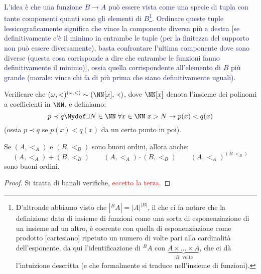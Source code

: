 \documentclass[11pt]{scrartcl}
\begin{document}
\textcolor{MidnightBlue}{L'idea è che una funzione $B \rightarrow A$ può essere vista come una specie di tupla con tante componenti quanti sono gli elementi di $B$\footnote{D'altronde abbiamo visto che $|{}^{B}A| = |A|^{|B|}$, il che ci fa notare che la definizione data di insieme di funzioni come una sorta di esponenziazione di un
insieme ad un altro, è coerente con quella di esponenziazione come prodotto [cartesiano] ripetuto un numero di volte pari alla cardinalità dell'esponente, da qui l'identificazione di ${}^{B}A$ con $\underbrace{A \times \ldots \times A}_{\text{$|B|$ volte}}$, che ci dà l'intuizione descritta (e che formalmente si traduce nell'insieme di funzioni).}.
Ordinare queste tuple lessicograficamente significa che vince la componente diversa più a destra [se definitivamente c'è il minimo in entrambe le tuple (per la finitezza del supporto non può essere diversamente), basta confrontare l'ultima componente dove sono diverse (questa cosa corrisponde a dire che entrambe le funzioni fanno definitivamente il minimo)], ossia quella corrispondente all'elemento di $B$ più grande (morale: vince chi fa di più prima che siano definitivamente uguali).}

\begin{exercise}
	Verificare che $(\omega,<)^{(\omega,<)} \sim (\NN[x],\prec)$, dove $\NN[x]$ denota l'insieme dei polinomi a coefficienti in $\NN$, e definiamo:
	\[ p \prec q \Mydef \exists N \in \NN \; \forall x \in \NN \; x > N \rightarrow p(x) < q(x)
		\]
	(ossia $p \prec q$ se $p(x)<q(x)$ da un certo punto in poi).
\end{exercise}

\begin{soln}
	
\end{soln}

\begin{proposition}
	Se $(A,<_A)$ e $(B,<_B)$ sono buoni ordini, allora anche:
	\[ (A,<_A) + (B,<_B) \qquad (A,<_A) \cdot (B,<_B) \qquad (A,<_A)^{(B.<_B)}
		\]
	sono buoni ordini.
\end{proposition}

\begin{proof}
	Si tratta di banali verifiche, \textcolor{red}{eccetto la terza}.
\end{proof}
\end{document}

